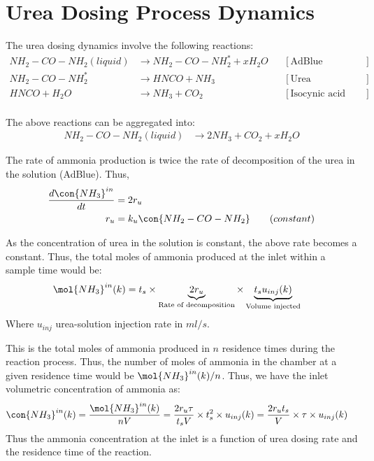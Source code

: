 \newpage
\section{Urea Dosing Process Dynamics}
The urea dosing dynamics involve the following reactions:
\begin{align*}
    NH_2 - CO - NH_2 (liquid) &\longrightarrow NH_2 - CO - NH_2^* + x H_2 O
                & &[\text{AdBlue evaporation}] \\
    NH_2 - CO - NH_2^*  &\longrightarrow  HNCO + NH_3
                & &[\text{Urea decomposition}] \\
    HNCO + H_2O &\longrightarrow NH_3 + CO_2
                & &[\text{Isocynic acid hydrolysis}] \\
\end{align*}

The above reactions can be aggregated into:
\begin{align*}
    NH_2 - CO - NH_2 (liquid) &\longrightarrow 2 NH_3 + CO_2 + x H_2 O
\end{align*}

The rate of ammonia production is twice the rate of decomposition of the urea in the solution (AdBlue). Thus,
\begin{align*}
    \frac{d \con{NH_3}^{in}}{dt} &= 2 r_{u}\\
    r_{u} &= k_{u} \con{NH_2 - CO - NH_2} \qquad (constant)
\end{align*}

As the concentration of urea in the solution is constant, the above rate becomes a constant. Thus, the total moles of
ammonia produced at the inlet within a sample time would be:
\begin{align*}
    \mol{NH_3}^{in} (k) &= t_s \times \underbrace{2 r_{u}}_{\text{Rate of decomposition}} \times \underbrace{t_s u_{inj} (k)}_{\text{Volume injected}}
\end{align*}
Where $u_{inj}$ urea-solution injection rate in $ml/s$.

This is the total moles of ammonia produced in $n$ residence times during the reaction process. Thus, the number of moles of ammonia in the chamber at a given residence time would be $\mol{NH_3}^{in}(k)/n$.
Thus, we have the inlet volumetric concentration of ammonia as:
\begin{align*}
    \con{NH_3}^{in} (k) &= \frac{\mol{NH_3}^{in} (k)}{nV}
                          = \frac{2 r_u \tau}{t_s V} \times t_s^2 \times u_{inj} (k)
                          = \frac{2 r_u t_s}{V} \times \tau \times u_{inj} (k)
\end{align*}
Thus the ammonia concentration at the inlet is a function of urea dosing rate and the residence time of the reaction.

